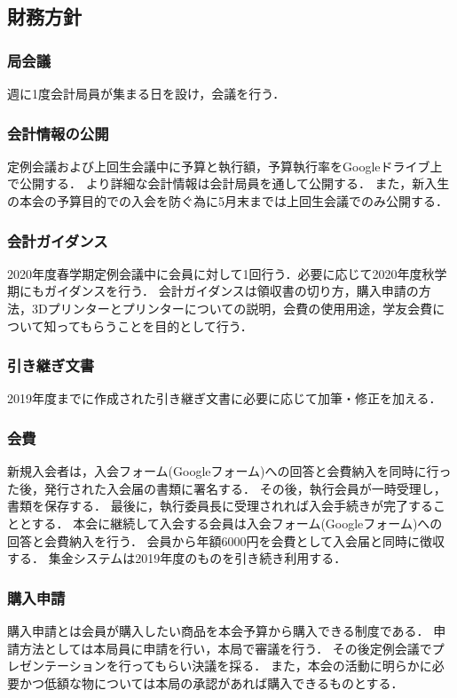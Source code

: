 \subsection*{財務方針}

\subsubsection*{局会議}
週に1度会計局員が集まる日を設け，会議を行う．

\subsubsection*{会計情報の公開}
定例会議および上回生会議中に予算と執行額，予算執行率をGoogleドライブ上で公開する．
より詳細な会計情報は会計局員を通して公開する．
また，新入生の本会の予算目的での入会を防ぐ為に5月末までは上回生会議でのみ公開する．

\subsubsection*{会計ガイダンス}
2020年度春学期定例会議中に会員に対して1回行う．必要に応じて2020年度秋学期にもガイダンスを行う．
会計ガイダンスは領収書の切り方，購入申請の方法，3Dプリンターとプリンターについての説明，会費の使用用途，学友会費について知ってもらうことを目的として行う．

\subsubsection*{引き継ぎ文書}
2019年度までに作成された引き継ぎ文書に必要に応じて加筆・修正を加える．

\subsubsection*{会費}
新規入会者は，入会フォーム(Googleフォーム)への回答と会費納入を同時に行った後，発行された入会届の書類に署名する．
その後，執行会員が一時受理し，書類を保存する．
最後に，執行委員長に受理されれば入会手続きが完了することとする．
本会に継続して入会する会員は入会フォーム(Googleフォーム)への回答と会費納入を行う．
会員から年額6000円を会費として入会届と同時に徴収する．
集金システムは2019年度のものを引き続き利用する．

\subsubsection*{購入申請}
購入申請とは会員が購入したい商品を本会予算から購入できる制度である．
申請方法としては本局員に申請を行い，本局で審議を行う．
その後定例会議でプレゼンテーションを行ってもらい決議を採る．
また，本会の活動に明らかに必要かつ低額な物については本局の承認があれば購入できるものとする．

